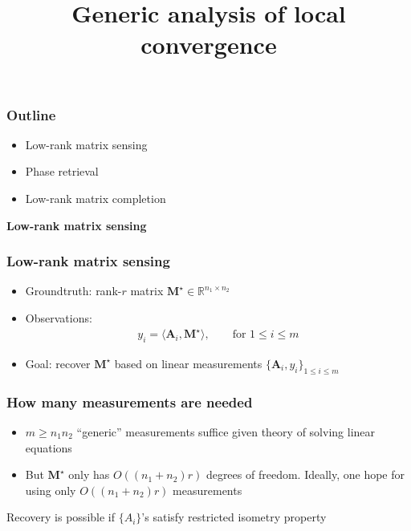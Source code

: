 \documentclass[compress,
mathserif,wide,%
]{beamer}
\title %
{Generic analysis of local convergence}
\begin{document}
\begin{frame}[plain]
  \titlepage

\end{frame}

\begin{frame}
	\frametitle{Outline}
	\begin{itemize}
		\item Low-rank matrix sensing
		\item Phase retrieval
		\item Low-rank matrix completion
	\end{itemize}
\end{frame}


\begin{frame}[plain]

\vfill
\begin{center}
  {\Large \bf Low-rank matrix sensing}
\end{center}
\vfill

\end{frame}


\begin{frame}
	\frametitle{Low-rank matrix sensing}
	\begin{itemize}
		\item Groundtruth: rank-$r$ matrix $\bm{M}^\star \in \mathbb{R}^{n_1 \times n_2}$
		\item Observations:
			\begin{align*}
				 y_{i} = \langle \bm{A}_i, \bm{M}^\star \rangle, \qquad \text{for } 1 \leq i \leq m
			\end{align*}
		\item Goal: recover $\bm{M}^\star$ based on linear measurements $\{ \bm{A}_i, y_i\}_{ 1 \leq i \leq m}$
	\end{itemize}
\end{frame}

\begin{frame}
	\frametitle{How many measurements are needed}
	\begin{itemize}
		\item $m \geq n_1 n_2$ ``generic'' measurements suffice given theory of solving linear equations
		\item But $\bm{M}^{\star}$ only has $O((n_1 + n_2)r)$ degrees of freedom. Ideally, one hope for using only $O((n_1 + n_2)r)$ measurements
	\end{itemize}

\vfill
	{

\begin{varblock}[\textwidth]{}
\centering
Recovery is possible if $\{A_i\}$'s satisfy restricted isometry property
\end{varblock}
}

\end{frame}
\end{document}
